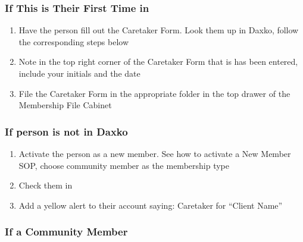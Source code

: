 \documentclass[
]{report}
\providecommand{\tightlist}{%
  \setlength{\itemsep}{0pt}\setlength{\parskip}{0pt}}\usepackage{longtable,booktabs,array}
\begin{document}
\hypertarget{if-this-is-their-first-time-in}{%
\subsubsection{If This is Their First Time
in}\label{if-this-is-their-first-time-in}}

\begin{enumerate}
\def\labelenumi{\arabic{enumi}.}
\setcounter{enumi}{1}
\tightlist
\item
  Have the person fill out the Caretaker Form. Look them up in Daxko,
  follow the corresponding steps below
\item
  Note in the top right corner of the Caretaker Form that is has been
  entered, include your initials and the date
\item
  File the Caretaker Form in the appropriate folder in the top drawer of
  the Membership File Cabinet
\end{enumerate}

\hypertarget{if-person-is-not-in-daxko}{%
\subsubsection{If person is not in
Daxko}\label{if-person-is-not-in-daxko}}

\begin{enumerate}
\def\labelenumi{\arabic{enumi}.}
\setcounter{enumi}{4}
\tightlist
\item
  Activate the person as a new member. See how to activate a New Member
  SOP, choose community member as the membership type
\item
  Check them in
\item
  Add a yellow alert to their account saying: Caretaker for ``Client
  Name''
\end{enumerate}

\hypertarget{if-a-community-member-1}{%
\subsubsection{If a Community Member}\label{if-a-community-member-1}}
\end{document}
